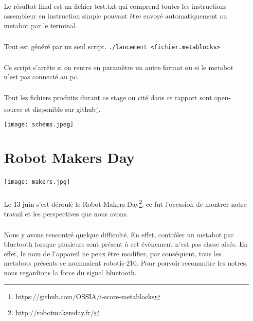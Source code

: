 \documentclass[10pt,a4paper]{report}
\begin{document}
\paragraph{}
Le résultat final est un fichier test.txt qui comprend toutes les instructions assembleur en instruction simple pouvant être envoyé automatiquement au metabot par le terminal.
\paragraph{}
Tout est généré par un seul script.
\texttt{./lancement <fichier.metablocks>}
\paragraph{}
Ce script s'arrête si on rentre en paramètre un autre format ou si le metabot n'est pas connecté au pc.
\paragraph{}
Tout les fichiers produits durant ce stage ou cité dans ce rapport sont open-source et disponible sur github\footnote{https://github.com/OSSIA/i-score-metablocks}.

\begin{center}
\texttt{[image: schema.jpeg]}
\end{center}


\paragraph{}
\chapter{Robot Makers Day}
\paragraph{}
\begin{center}
\texttt{[image: makers.jpg]}
\end{center}
\paragraph{}
Le 13 juin s'est déroulé le Robot Makers Day\footnote{http://robotmakersday.fr/}, ce fut l'occasion de montrer notre travail et les perspectives que nous avons.
\paragraph{}
Nous y avons rencontré quelque difficulté. En effet, contrôler un metabot par bluetooth lorsque plusieurs sont présent à cet évènement n'est pas chose aisés. En effet, le nom de l'appareil ne peux être modifier, par conséquent, tous les metabots présents se nommaient robotis-210. Pour pouvoir reconnaitre les notres, nous regardions la force du signal bluetooth.
\end{document}
